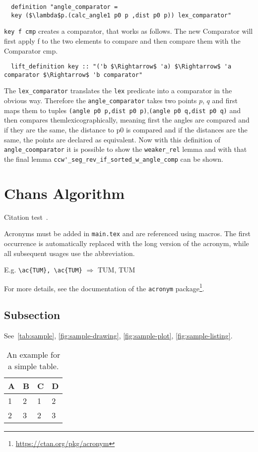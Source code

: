 \begin{lstlisting}
  definition "angle_comparator = 
  key ($\lambda$p.(calc_angle1 p0 p ,dist p0 p)) lex_comparator"
\end{lstlisting}
\lstinline|key f cmp| creates a comparator, that works as follows.
The new Comparator will first apply f to the two elements to compare and
then compare them with the Comparator cmp. 
\begin{lstlisting}
  lift_definition key :: "('b $\Rightarrow$ 'a) $\Rightarrow$ 'a comparator $\Rightarrow$ 'b comparator"
\end{lstlisting}
The \lstinline|lex_comparator| translates the \lstinline|lex| predicate into a comparator in the 
obvious way. Therefore the \lstinline|angle_comparator| takes two points $p$, $q$ and first maps them to 
tuples \lstinline|(angle p0 p,dist p0 p)|,\lstinline|(angle p0 q,dist p0 q)| and then compares 
themlexicographically, meaning first the angles are compared and if they are the same, the distance to p0
is compared and if the distances are the same, the points are declared as equivalent. Now with this definition
of \lstinline|angle_coomparator| it is possible to show the \lstinline|weaker_rel| lemma and with that the final 
lemma \lstinline|ccw'_seg_rev_if_sorted_w_angle_comp| can be shown.


\section{Chans Algorithm}

Citation test~\parencite{latex}.

Acronyms must be added in \texttt{main.tex} and are referenced using macros. The first occurrence is automatically replaced with the long version of the acronym, while all subsequent usages use the abbreviation.

E.g. \texttt{\textbackslash ac\{TUM\}, \textbackslash ac\{TUM\}} $\Rightarrow$ \ac{TUM}, \ac{TUM}

For more details, see the documentation of the \texttt{acronym} package\footnote{\url{https://ctan.org/pkg/acronym}}.
\subsection{Subsection}

See~\autoref{tab:sample}, \autoref{fig:sample-drawing}, \autoref{fig:sample-plot}, \autoref{fig:sample-listing}.

\begin{table}[htpb]
  \caption[Example table]{An example for a simple table.}\label{tab:sample}
  \centering
  \begin{tabular}{l l l l}
    \toprule
      A & B & C & D \\
    \midrule
      1 & 2 & 1 & 2 \\
      2 & 3 & 2 & 3 \\
    \bottomrule
  \end{tabular}
\end{table}

